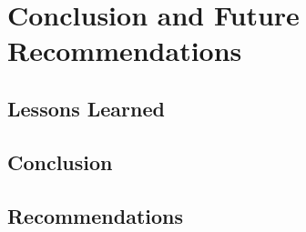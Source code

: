 \chapter{Conclusion and Future Recommendations}

\section{Lessons Learned}

\section{Conclusion}

\section{Recommendations}
